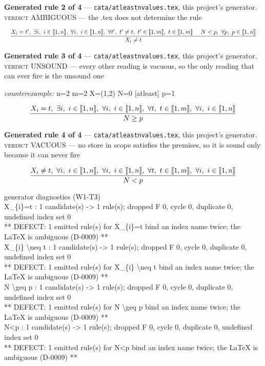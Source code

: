 \documentclass[10pt,a4paper]{article}
\newcommand{\diag}[1]{{\small\itshape\raggedright #1\par}}
\newcommand{\rulebox}[1]{%
  \[\resizebox{\ifdim\width>\linewidth\linewidth\else\width\fi}{!}%
    {$\displaystyle #1$}\]}
\begin{document}
{\small\textbf{Generated rule 2 of 4} --- \texttt{cata/atleastnvalues.tex}, this project's generator. \textsc{verdict} AMBIGUOUS --- the .tex does not determine the rule\par}
\rulebox{\frac{X_{i}=t',~\exists i,~i \in \llbracket1,n\rrbracket,~\forall i,~i \in \llbracket1,n\rrbracket,~\forall t',~t' \neq t,~t' \in \llbracket1,m\rrbracket,~t \in \llbracket1,m\rrbracket~~~~N<p,~\forall p,~p \in \llbracket1,n\rrbracket}{X_{i} \neq t}}

{\small\textbf{Generated rule 3 of 4} --- \texttt{cata/atleastnvalues.tex}, this project's generator. \textsc{verdict} UNSOUND --- every other reading is vacuous, so the only reading that can ever fire is the unsound one\par}
{\small\textit{counterexample:} n=2 m=2 X=(1,2) N=0 [atleast] p=1\par}
\rulebox{\frac{X_{i}=t,~\exists i,~i \in \llbracket1,n\rrbracket,~\forall i,~i \in \llbracket1,n\rrbracket,~\forall t,~t \in \llbracket1,m\rrbracket,~\forall i,~i \in \llbracket1,n\rrbracket}{N \geq p}}

{\small\textbf{Generated rule 4 of 4} --- \texttt{cata/atleastnvalues.tex}, this project's generator. \textsc{verdict} VACUOUS --- no store in scope satisfies the premises, so it is sound only because it can never fire\par}
\rulebox{\frac{X_{i} \neq t,~\forall i,~i \in \llbracket1,n\rrbracket,~\forall i,~i \in \llbracket1,n\rrbracket,~\forall t,~t \in \llbracket1,m\rrbracket,~\forall i,~i \in \llbracket1,n\rrbracket}{N<p}}

\diag{generator diagnostics (W1-T3)\\{} X\_\{i\}=t : 1 candidate(s) -> 1 rule(s); dropped F 0, cycle 0, duplicate 0, undefined index set 0\\{}   ** DEFECT: 1 emitted rule(s) for X\_\{i\}=t bind an index name twice; the LaTeX is ambiguous (D-0009) **\\{} X\_\{i\} \textbackslash{}neq t : 1 candidate(s) -> 1 rule(s); dropped F 0, cycle 0, duplicate 0, undefined index set 0\\{}   ** DEFECT: 1 emitted rule(s) for X\_\{i\} \textbackslash{}neq t bind an index name twice; the LaTeX is ambiguous (D-0009) **\\{} N \textbackslash{}geq p : 1 candidate(s) -> 1 rule(s); dropped F 0, cycle 0, duplicate 0, undefined index set 0\\{}   ** DEFECT: 1 emitted rule(s) for N \textbackslash{}geq p bind an index name twice; the LaTeX is ambiguous (D-0009) **\\{} N<p : 1 candidate(s) -> 1 rule(s); dropped F 0, cycle 0, duplicate 0, undefined index set 0\\{}   ** DEFECT: 1 emitted rule(s) for N<p bind an index name twice; the LaTeX is ambiguous (D-0009) **}
\end{document}
